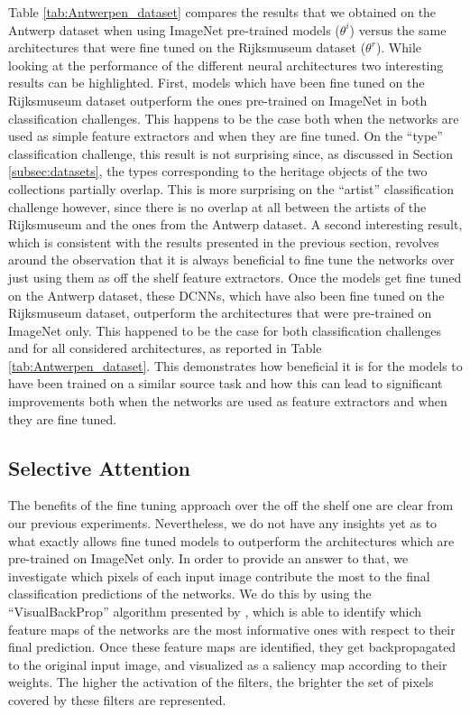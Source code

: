Table \ref{tab:Antwerpen_dataset} compares the results that we obtained on the Antwerp dataset when using ImageNet pre-trained models ($\theta^{i}$) versus the same architectures that were fine tuned on the Rijksmuseum dataset ($\theta^{r}$). While looking at the performance of the different neural architectures two interesting results can be highlighted. First, models which have been fine tuned on the Rijksmuseum dataset outperform the ones pre-trained on ImageNet in both classification challenges. This happens to be the case both when the networks are used as simple feature extractors and when they are fine tuned. On the ``type'' classification challenge, this result is not surprising since, as discussed in Section \ref{subsec:datasets}, the types corresponding to the heritage objects of the two collections partially overlap. This is more surprising on the ``artist'' classification challenge however, since there is no overlap at all between the artists of the Rijksmuseum and the ones from the Antwerp dataset.
A second interesting result, which is consistent with the results presented in the previous section, revolves around the observation that it is always beneficial to fine tune the networks over just using them as off the shelf feature extractors. Once the models get fine tuned on the Antwerp dataset, these DCNNs, which have also been fine tuned on the Rijksmuseum dataset, outperform the architectures that were pre-trained on ImageNet only. This happened to be the case for both classification challenges and for all considered architectures, as reported in Table \ref{tab:Antwerpen_dataset}. This demonstrates how beneficial it is for the models to have been trained on a similar source task and how this can lead to significant improvements both when the networks are used as feature extractors and when they are fine tuned. 



\subsection{Selective Attention}

The benefits of the fine tuning approach over the off the shelf one are clear from our previous experiments. Nevertheless, we do not have any insights yet as to what exactly allows fine tuned models to outperform the architectures which are pre-trained on ImageNet only. In order to provide an answer to that, we investigate which pixels of each input image contribute the most to the final classification predictions of the networks. We do this by using the ``VisualBackProp'' algorithm presented by \cite{bojarski2016visualbackprop}, which is able to identify which feature maps of the networks are the most informative ones with respect to their final prediction. Once these feature maps are identified, they get backpropagated to the original input image, and visualized as a saliency map according to their weights. The higher the activation of the filters, the brighter the set of pixels covered by these filters are represented.

